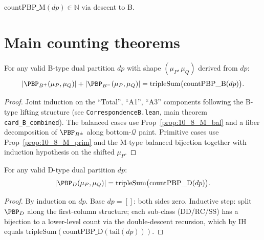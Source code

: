 \begin{definition}
  \label{def:countPBP_M}
  \leanok
  $\mathrm{countPBP\_M}(dp) \in \mathbb{N}$ via descent to B.
\end{definition}

\section{Main counting theorems}

\begin{proposition}
  \label{prop:10_11_B}
  \leanok
  For any valid B-type dual partition $dp$ with shape $(\mu_P, \mu_Q)$ derived from $dp$:
  \[ |\PBP_{B^+}(\mu_P, \mu_Q)| + |\PBP_{B^-}(\mu_P, \mu_Q)| = \mathrm{tripleSum}\big(\mathrm{countPBP\_B}(dp)\big). \]
\end{proposition}
\begin{proof}
  \leanok
  Joint induction on the ``Total'', ``A1'', ``A3'' components following the
  B-type lifting structure (see \texttt{CorrespondenceB.lean}, main theorem
  \texttt{card\_B\_combined}). The balanced cases use Prop~\ref{prop:10_8_M_bal}
  and a fiber decomposition of $\PBP_{B^\pm}$ along bottom-$\mathcal{Q}$ paint.
  Primitive cases use Prop~\ref{prop:10_8_M_prim} and the M-type balanced
  bijection together with induction hypothesis on the shifted $\mu_P$.
\end{proof}

\begin{proposition}
  \label{prop:10_11_D}
  \leanok
  For any valid D-type dual partition $dp$:
  \[ |\PBP_D(\mu_P, \mu_Q)| = \mathrm{tripleSum}\big(\mathrm{countPBP\_D}(dp)\big). \]
\end{proposition}
\begin{proof}
  \leanok
  By induction on $dp$. Base $dp = []$: both sides zero. Inductive step: split $\PBP_D$ along the first-column structure; each sub-class (DD/RC/SS) has a bijection to a lower-level count via the double-descent recursion, which by IH equals $\mathrm{tripleSum}(\mathrm{countPBP\_D}(\mathrm{tail}(dp)))$.
\end{proof}


